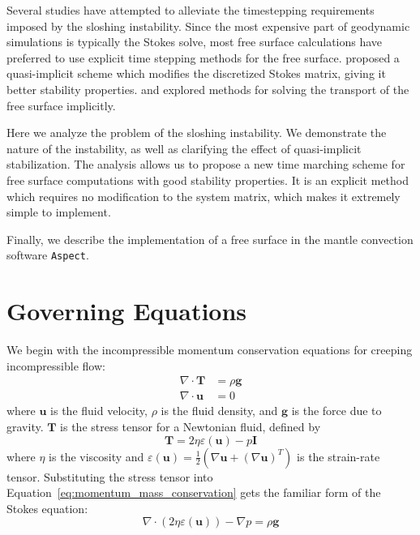 \documentclass[preprint,12pt,authoryear]{elsarticle}
\begin{document}
Several studies have attempted to alleviate the timestepping requirements imposed by the sloshing 
instability. Since the most expensive part of geodynamic simulations is typically the Stokes solve,
most free surface calculations have preferred to use explicit time stepping methods for the free 
surface. \citet{kaus2010stabilization} proposed a quasi-implicit scheme which modifies the discretized 
Stokes matrix, giving it better stability properties.  \citet{kramer2012implicit} and \citet{furuichi2015implicit}
explored methods for solving the transport of the free surface implicitly.

Here we analyze the problem of the sloshing instability.  We demonstrate the nature of the instability, 
as well as clarifying the effect of quasi-implicit stabilization.
The analysis allows us to propose a new time marching scheme for free surface computations with 
good stability properties. It is an explicit method which requires no modification to the system matrix,
which makes it extremely simple to implement.

Finally, we describe the implementation of a free surface in the mantle convection software \texttt{Aspect}. 

\section{Governing Equations}
\label{sec:governing}

We begin with the incompressible momentum conservation equations for creeping incompressible flow:
\begin{equation}
\begin{aligned}
\nabla \cdot \mathbf{T} &= \rho \mathbf{g} \\
\nabla \cdot \mathbf{u} &= 0
\end{aligned}
\label{eq:momentum_mass_conservation}
\end{equation}
where $\mathbf{u}$ is the fluid velocity, $\rho$ is the fluid density, and $\mathbf{g}$ is the force due to gravity.
$\mathbf{T}$ is the stress tensor for a Newtonian fluid, defined by
\begin{equation}
\mathbf{T} = 2 \eta \varepsilon(\mathbf{u}) - p \mathbf{I}
\label{eq:stress_tensor}
\end{equation}
where $\eta$ is the viscosity and $\varepsilon(\mathbf{u}) = \frac{1}{2}(\nabla \mathbf{u} + (\nabla \mathbf{u} )^T )$ is the strain-rate tensor.
Substituting the stress tensor into Equation~\eqref{eq:momentum_mass_conservation} gets the familiar form of the Stokes equation:
\begin{equation}
\nabla \cdot \left( 2 \eta \varepsilon( \mathbf{u} ) \right) - \nabla p = \rho \mathbf{g}
\label{eq:stokes}
\end{equation}
\end{document}
